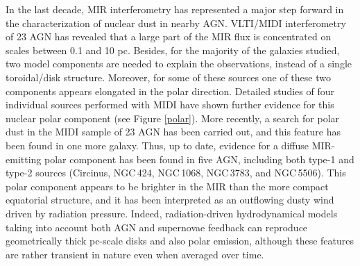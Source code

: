 \documentclass{natureprintstyle}
\begin{document}
In the last decade, MIR interferometry has represented a major step forward in the characterization of nuclear dust in nearby AGN. VLTI/MIDI interferometry of 23 AGN has revealed that a large part of the MIR flux is concentrated on scales between 0.1 and 10 pc\cite{Tristram09,Burtscher13}. Besides, for the majority of the galaxies studied, two model components are needed to explain the observations\cite{Burtscher13}, instead of a single toroidal/disk structure. Moreover, for some of these sources one of these two components appears elongated in the polar direction. Detailed studies of four individual sources performed with MIDI\cite{Honig12,Honig13,Tristram14,Lopez14} have shown further evidence for this nuclear polar component (see Figure \ref{polar}). More recently, a search for polar dust in the MIDI sample of 23 AGN has been carried out\cite{Lopez16}, and this feature has been found in one more galaxy. Thus, up to date, evidence for a diffuse MIR-emitting polar component has been found in five AGN, including both type-1 and type-2 sources (Circinus, NGC\,424, NGC\,1068, NGC\,3783, and NGC\,5506). This polar component appears to be brighter in the MIR than the more compact equatorial structure, and {it has been interpreted as an outflowing dusty wind driven by radiation pressure\cite{Honig12}. Indeed, radiation-driven hydrodynamical models\cite{Wada12,Wada16} taking into account both AGN and supernovae feedback can reproduce geometrically thick pc-scale disks and also polar emission, although these features are rather transient in nature even when averaged over time. %
} 

\begin{figure*}
\centering
{}
\caption{{Interferometry results from VLTI/MIDI observations of two nearby AGN.} (a) 3-component model that reproduces the observed MIDI visibilities obtained for the Circinus galaxy\cite{Tristram14}. 
This includes a polar component containing most of the MIR emission, a disk component, and 
an unresolved component. (b) Relative contributions of the disk and polar components derived from the model that better reproduces the MIDI observations of the type-1 AGN NGC\,3783\cite{Honig13}.}
\label{polar}
\end{figure*}
\end{document}
